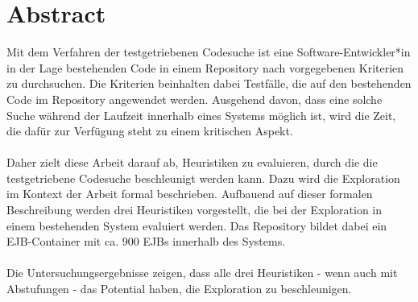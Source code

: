 \documentclass[a4paper,12pt]{book}
\begin{document}


\frontmatter

\section*{Abstract}
Mit dem Verfahren der testgetriebenen Codesuche ist eine Software-Entwickler*in in der Lage bestehenden Code in einem Repository nach vorgegebenen Kriterien zu durchsuchen. Die Kriterien beinhalten dabei Testfälle, die auf den bestehenden Code im Repository angewendet werden.  Ausgehend davon, dass eine solche Suche während der Laufzeit innerhalb eines Systems möglich ist, wird die Zeit, die dafür zur Verfügung steht zu einem kritischen Aspekt.
\\\\
Daher zielt diese Arbeit darauf ab, Heuristiken zu evaluieren, durch die die testgetriebene Codesuche beschleunigt werden kann. Dazu wird die Exploration im Kontext der Arbeit formal beschrieben. Aufbauend auf dieser formalen Beschreibung werden drei Heuristiken vorgestellt, die bei der Exploration in einem bestehenden System evaluiert werden. Das Repository bildet dabei ein EJB-Container mit ca. 900 EJBs innerhalb des Systems. 
\\\\
Die Untersuchungsergebnisse zeigen, dass alle drei Heuristiken - wenn auch mit Abstufungen - das Potential haben, die Exploration zu beschleunigen.
\newpage





\tableofcontents

{}
\listoffigures

{}
\listoftables

{}
\lstlistoflistings



\mainmatter









\newpage
\appendix
{}
\printglossaries








{}



%
%


%


\end{document}
